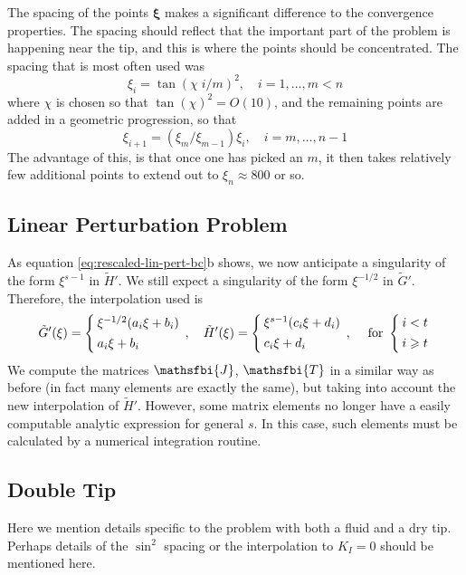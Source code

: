 \documentclass{jfm}
\begin{document}
The spacing of the points $\boldsymbol{\xi}$ makes a significant difference to 
the convergence properties. The spacing should reflect that the important 
part of the problem is happening near the tip, and this is where the points
should be concentrated. The spacing that is most often used was 
\begin{equation}
\xi_i = \tan( \chi \; i/m )^2, \quad i=1,\dots,m < n
\end{equation}
where $\chi$ is chosen so that $\tan(\chi)^2 = O(10)$, and the remaining points
are added in a geometric progression, so that 
\begin{equation}
\xi_{i+1} = (\xi_m/\xi_{m-1})\xi_{i} , \quad i = m,\dots,n-1
\end{equation}
The advantage of this, is that once one has picked an $m$, it then takes
relatively few additional points to extend out to $\xi_n \approx 800$ or so.
%
%
\subsection{Linear Perturbation Problem}
%
%
As equation \ref{eq:rescaled-lin-pert-bc}b shows, we now anticipate a 
singularity of the form $\xi^{s-1}$ in $\tilde{H}'$. We still expect a
singularity of the form $\xi^{-1/2}$ in $\tilde{G}'$. Therefore, the
interpolation used is
\begin{equation}
\setlength{\arraycolsep}{2pt}
\tilde{G}'(\xi) = \left\{ \begin{array}{l}  
\xi^{-1/2}(a_i \xi + b_i) \\[4pt]
a_i \xi + b_i
 \end{array}\right., \quad
\tilde{H}'(\xi) = \left\{ \begin{array}{l}  
\xi^{s-1}(c_i \xi + d_i) \\[4pt]
c_i \xi + d_i
 \end{array}\right. , \quad
\; \mbox{for\ } \left\{ \begin{array}{l}  
i<t\\[4pt]
i\geq t
\end{array}\right.
\end{equation}
We compute the matrices $\mathsfbi{J}$, $\mathsfbi{T}$ in a similar way as 
before (in fact many elements are exactly the same), but taking into account 
the new interpolation of $\tilde{H}'$. However, some matrix elements no longer
have a easily computable analytic expression for general $s$. In this case, 
such elements must be calculated by a numerical integration routine. 
\subsection{Double Tip}
Here we mention details specific to the problem with both a fluid
and a dry tip. Perhaps details of the $\sin^2$ spacing or the interpolation
to $K_I=0$ should be mentioned here.
%
%
% 
\end{document}
